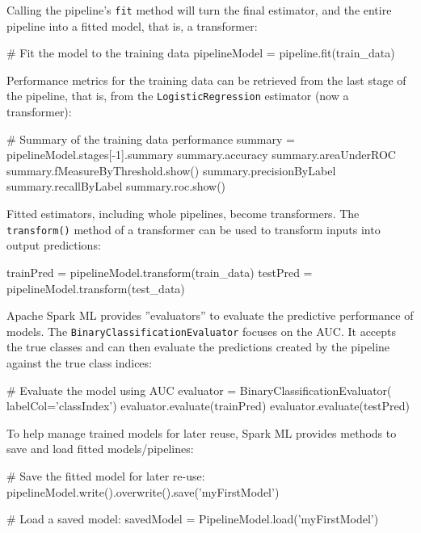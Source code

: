 \begin{withcode}
Calling the pipeline's \texttt{fit} method will turn the final estimator, and the entire pipeline into a fitted model, that is, a transformer:

\begin{pythoncode}
# Fit the model to the training data
pipelineModel = pipeline.fit(train_data)
\end{pythoncode}

Performance metrics for the training data can be retrieved from the last stage of the pipeline, that is, from the \texttt{LogisticRegression} estimator (now a transformer):

\begin{pythoncode}
# Summary of the training data performance
summary = pipelineModel.stages[-1].summary
summary.accuracy
summary.areaUnderROC
summary.fMeasureByThreshold.show()
summary.precisionByLabel
summary.recallByLabel
summary.roc.show()
\end{pythoncode}

Fitted estimators, including whole pipelines, become transformers. The \texttt{transform()} method of a transformer can be used to transform inputs into output predictions: 

\begin{pythoncode}
trainPred = pipelineModel.transform(train_data)
testPred = pipelineModel.transform(test_data)
\end{pythoncode}

Apache Spark ML provides ''evaluators'' to evaluate the predictive performance of models. The \texttt{BinaryClassificationEvaluator} focuses on the AUC. It accepts the true classes and can then evaluate the predictions created by the pipeline against the true class indices:

\begin{pythoncode}
# Evaluate the model using AUC
evaluator = BinaryClassificationEvaluator(
    labelCol='classIndex')
evaluator.evaluate(trainPred)
evaluator.evaluate(testPred)
\end{pythoncode}

To help manage trained models for later reuse, Spark ML provides methods to save and load fitted models/pipelines:

\begin{pythoncode}
# Save the fitted model for later re-use:
pipelineModel.write().overwrite().save('myFirstModel')

# Load a saved model:
savedModel = PipelineModel.load('myFirstModel')
\end{pythoncode}
\end{withcode}

